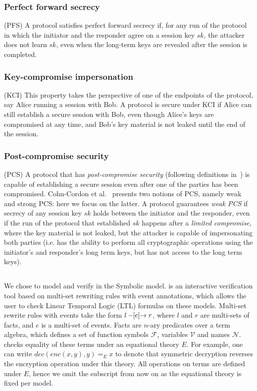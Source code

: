 \spacehack
\subsubsection{Perfect forward secrecy} (PFS) A protocol satisfies perfect forward
secrecy if, for any run of the protocol in which the initiator and the responder
agree on a session key $sk$, the attacker does not learn $sk$, even when the
long-term keys are revealed after the session is completed.

\spacehack
\subsubsection{Key-compromise impersonation} (KCI) This property takes the perspective of one
of the endpoints of the protocol, say Alice running a session with Bob. A
protocol is secure under KCI if Alice can still establish a secure session with
Bob, even though Alice's keys are compromised at any time, and Bob's key
material is not leaked until the end of the session.

\spacehack
\subsubsection{Post-compromise security} (PCS) A protocol that has
\emph{post-compromise security} (following definitions in~\cite{cohn2016post})
is capable of establishing a secure session even after one of the parties has
been compromised. Cohn-Cordon et al.~\cite{cohn2016post} presents two notions of
PCS, namely weak and strong PCS: here we focus on the latter.
%
A protocol guarantees \emph{weak PCS} if secrecy of any session key $sk$ holds
between the initiator and the responder, even if the run of the protocol that
established $sk$ happens after a \emph{limited compromise}, where the key
material is not leaked, but the attacker is capable of impersonating both
parties (i.e. has the ability to perform all cryptographic operations using the
initiator's and responder's long term keys, but has not access to the long term
keys).

\spacehack
\subsection{\mTamarin{}}
\label{sec:tamarin}
\fillhack
We chose \mTamarin{} to model and verify \mEdhoc{} in the Symbolic model.
%
\mTamarin{} is an interactive verification tool based on multi-set rewriting rules
with event annotations, which allows the user to check Linear Temporal Logic
(LTL) formulas on these models.
%
Multi-set rewrite rules with events take the form $ l \ifarrow[e] r $,
where $l$ and $r$ are multi-sets of facts, and $e$ is a multi-set of events.
Facts are $n$-ary predicates over a term algebra, which defines a set of function
symbols $\mathcal F$, variables $\mathcal V$ and names $\mathcal N$. \mTamarin{}
checks equality of these terms under an equational theory $E$. For example,
one can write $ dec(enc(x,y),y) =_E x $
to denote that symmetric decryption reverses the encryption operation under this theory.
All operations on terms are defined under $E$, hence we omit the
subscript from now on as the equational theory is fixed per model.

